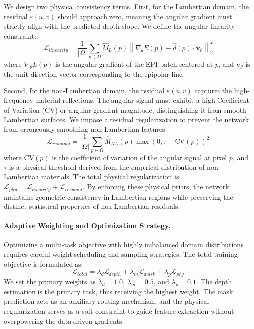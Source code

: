 We design two physical consistency terms. First, for the Lambertian domain, the residual $\varepsilon(u,v)$ should approach zero, meaning the angular gradient must strictly align with the predicted depth slope. We define the angular linearity constraint:
\begin{equation}
\label{eq:eq29}
\mathcal{L}_{linearity} = \frac{1}{|\Omega|} \sum_{p \in \Omega} \hat{M}_L(p) \left\| \nabla_{\theta} E(p) - \hat{d}(p) \cdot \mathbf{v}_{\theta} \right\|_2^2
\end{equation}
where $\nabla_{\theta} E(p)$ is the angular gradient of the EPI patch centered at $p$, and $\mathbf{v}_{\theta}$ is the unit direction vector corresponding to the epipolar line. 

Second, for the non-Lambertian domain, the residual $\varepsilon(u,v)$ captures the high-frequency material reflections. The angular signal must exhibit a high Coefficient of Variation (CV) or angular gradient magnitude, distinguishing it from smooth Lambertian surfaces. We impose a residual regularization to prevent the network from erroneously smoothing non-Lambertian features:
\begin{equation}
\label{eq:eq30}
\mathcal{L}_{residual} = \frac{1}{|\Omega|} \sum_{p \in \Omega} \hat{M}_{NL}(p) \max(0, \tau - \text{CV}(p))^2
\end{equation}
where $\text{CV}(p)$ is the coefficient of variation of the angular signal at pixel $p$, and $\tau$ is a physical threshold derived from the empirical distribution of non-Lambertian materials. The total physical regularization is $\mathcal{L}_{phy} = \mathcal{L}_{linearity} + \mathcal{L}_{residual}$. By enforcing these physical priors, the network maintains geometric consistency in Lambertian regions while preserving the distinct statistical properties of non-Lambertian residuals.

\paragraph{Adaptive Weighting and Optimization Strategy.}
Optimizing a multi-task objective with highly imbalanced domain distributions requires careful weight scheduling and sampling strategies. The total training objective is formulated as:
\begin{equation}
\label{eq:eq31}
\mathcal{L}_{total} = \lambda_d \mathcal{L}_{depth} + \lambda_m \mathcal{L}_{mask} + \lambda_p \mathcal{L}_{phy}
\end{equation}
We set the primary weights as $\lambda_d = 1.0$, $\lambda_m = 0.5$, and $\lambda_p = 0.1$. The depth estimation is the primary task, thus receiving the highest weight. The mask prediction acts as an auxiliary routing mechanism, and the physical regularization serves as a soft constraint to guide feature extraction without overpowering the data-driven gradients.

